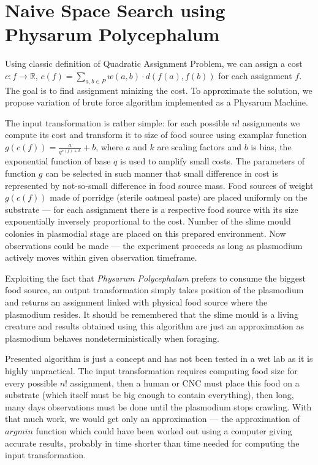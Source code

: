 \section{Naive Space Search using Physarum Polycephalum}
\label{section:algorithm_naive}

Using classic definition of Quadratic Assignment Problem, we can assign a cost $c : f \rightarrow \mathbb{R}$, $c(f) = \sum_{a,b\in P}w(a,b)\cdot d(f(a), f(b))$ for each assignment $f$. The goal is to find assignment minizing the cost. To approximate the solution, we propose variation of brute force algorithm implemented as a Physarum Machine.

The input transformation is rather simple: for each possible $n!$ assignments we compute its cost and transform it to size of food source using examplar function $g(c(f)) = \frac{a}{q^{c(f)+k}}+b$, where $a$ and $k$ are scaling factors and $b$ is bias, the exponential function of base $q$ is used to amplify small costs. The parameters of function $g$ can be selected in such manner that small difference in cost is represented by not-so-small difference in food source mass. Food sources of weight $g(c(f))$ made of porridge (sterile oatmeal paste) are placed uniformly on the substrate --- for each assignment there is a respective food source with its size exponentially inversely proportional to the cost. Number of the slime mould colonies in plasmodial stage are placed on this prepared environment. Now observations could be made --- the experiment proceeds as long as plasmodium actively moves within given observation timeframe. 

Exploiting the fact that \textit{Physarum Polycephalum} prefers to consume the biggest food source, an output transformation simply takes position of the plasmodium and returns an assignment linked with physical food source where the plasmodium resides. It should be remembered that the slime mould is a living creature and results obtained using this algorithm are just an approximation as plasmodium behaves nondeterministically when foraging.

Presented algorithm is just a concept and has not been tested in a wet lab as it is highly unpractical. The input transformation requires computing food size for every possible $n!$ assignment, then a human or CNC must place this food on a substrate (which itself must be big enough to contain everything), then long, many days observations must be done until the plasmodium stops crawling. With that much work, we would get only an approximation --- the approximation of $argmin$ function which could have been worked out using a computer giving accurate results, probably in time shorter than time needed for computing the input transformation. 

